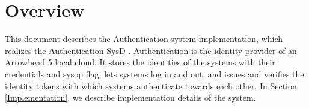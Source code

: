 \documentclass[a4paper]{arrowhead}
\begin{document}
\sloppy

\ArrowheadSetup

\begin{center}
  \vspace*{1cm}
  \huge{\arrowtitle}

  \vspace*{0.2cm}
  \LARGE{\arrowtype}
  \vspace*{1cm}

  \vspace*{\fill}


  \vspace*{1cm}
  \vspace*{\fill}

  \begin{abstract}
    This document describes the design and implementation of the Authentication core system of Arrowhead 5.2.2 in Java Spring (\texttt{ah5-core-java-spring/authentication}).
  \end{abstract}

  \vspace*{1cm}
\end{center}

\newpage

\tableofcontents
\newpage

\section{Overview}
\label{sec:overview}

This document describes the Authentication system implementation, which realizes the Authentication SysD \cite{auth-sysd}. Authentication is the identity provider of an Arrowhead 5 local cloud. It stores the identities of the systems with their credentials and sysop flag, lets systems log in and out, and issues and verifies the identity tokens with which systems authenticate towards each other.
In Section \ref{Implementation}, we describe implementation details of the system.

\newpage
\end{document}
